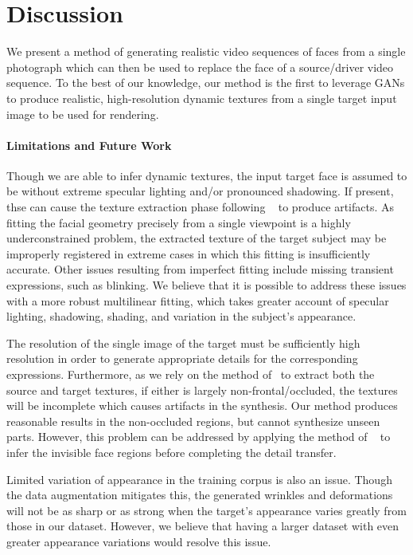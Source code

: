 
\section{Discussion}

We present a method of generating realistic video sequences of faces from a single photograph 
which can then be used to replace the face of a source/driver video sequence. 
To the best of our knowledge, our method is the first
to leverage GANs to produce realistic, high-resolution dynamic textures from a single target input image to be used for rendering.  

\paragraph{Limitations and Future Work}
Though we are able to infer dynamic textures, the input target face is assumed to be without extreme specular lighting and/or pronounced shadowing. If present, thse can cause the texture extraction phase following ~\cite{f2f} to produce artifacts. As fitting the facial geometry precisely from a single viewpoint is a highly underconstrained problem, the extracted texture of the target subject may be improperly registered in extreme cases in which this fitting is insufficiently accurate. Other issues resulting from imperfect fitting include missing transient expressions, such as blinking. We believe that it is possible to address these issues with a more robust multilinear fitting, which takes greater account of specular lighting, shadowing, shading, and variation in the subject's appearance.   

The resolution of the single image of the target must be sufficiently high resolution in order to generate appropriate details for the corresponding expressions.  Furthermore, as we rely on the method of~\cite{f2f} to extract both the source and target textures, if either is largely non-frontal/occluded, the textures will be incomplete which causes artifacts in the synthesis.  Our method produces reasonable results in the non-occluded regions, but cannot synthesize unseen parts.  However, this problem can be addressed by applying the method of ~\cite{saito2016} to infer the invisible face regions before completing the detail transfer.  

Limited variation of appearance in the training corpus is also an issue.  Though the data augmentation mitigates this, the generated wrinkles and deformations will not be as sharp or as strong when the target's appearance varies greatly from those in our dataset.  However, we believe that having a larger dataset with even greater appearance variations would resolve this issue.

\vfill\eject

